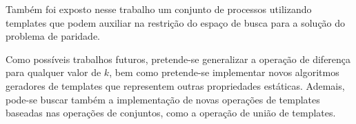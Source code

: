 Também foi exposto nesse trabalho um conjunto de processos utilizando templates que podem auxiliar na restrição do espaço de busca para a solução do problema de paridade.

Como possíveis trabalhos futuros, pretende-se generalizar a operação de diferença para qualquer valor de $k$, bem como pretende-se implementar novos algoritmos geradores de templates que representem outras propriedades estáticas. Ademais, pode-se buscar também a implementação de novas operações de templates baseadas nas operações de conjuntos, como a operação de união de templates.
